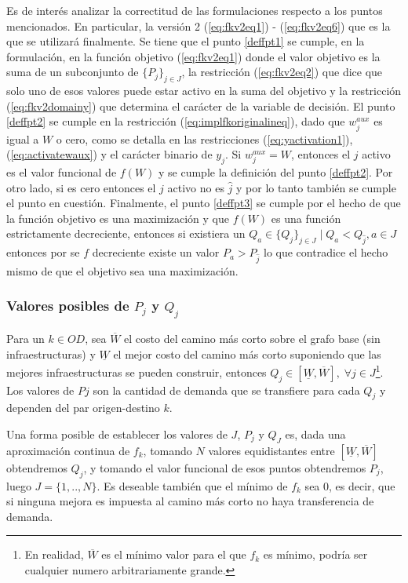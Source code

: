 \documentclass{article}
\begin{document}
  Es de interés analizar la correctitud de las formulaciones respecto a los puntos mencionados. En particular, la versión 2 (\ref{eq:fkv2eq1}) - (\ref{eq:fkv2eq6}) que es la que se utilizará finalmente. Se tiene que el punto \ref{deffpt1} se cumple, en la formulación, en la función objetivo (\ref{eq:fkv2eq1}) donde el valor objetivo es la suma de un subconjunto de $\{P_j\}_{j \in J}$, la restricción (\ref{eq:fkv2eq2}) que dice que solo uno de esos valores puede estar activo en la suma del objetivo y la restricción (\ref{eq:fkv2domainy}) que determina el carácter de la variable de decisión. El punto \ref{deffpt2} se cumple en la restricción (\ref{eq:implfkoriginalineq}), dado que $w^{aux}_j$ es igual a $W$ o cero, como se detalla en las restricciones (\ref{eq:yactivation1}), (\ref{eq:activatewaux}) y el carácter binario de $y_j$. Si $w^{aux}_j = W$, entonces el $j$ activo es el valor funcional de $f(W)$ y se cumple la definición del punto \ref{deffpt2}. Por otro lado, si es cero entonces el $j$ activo no es $\hat{j}$ y por lo tanto también se cumple el punto en cuestión. Finalmente, el punto \ref{deffpt3} se cumple por el hecho de que la función objetivo es una maximización y que $f(W)$ es una función estrictamente decreciente, entonces si existiera un $Q_a \in \{Q_j\}_{j \in J} \;|\; Q_a < Q_{\hat{j}}, a \in J$ entonces por se $f$ decreciente existe un valor $P_a > P_{\hat{j}}$ lo que contradice el hecho mismo de que el objetivo sea una maximización.

  \subsubsection*{Valores posibles de $P_j$ y $Q_j$}

  Para un $k \in OD$, sea $\overline{W}$ el costo del camino más corto sobre el grafo base (sin infraestructuras) y $\underline{W}$ el mejor costo del camino más corto suponiendo que las mejores infraestructuras se pueden construir, entonces $Q_j \in [\underline{W}, \overline{W}],\; \forall j \in J$\footnote{En realidad, $\overline{W}$ es el mínimo valor para el que $f_k$ es mínimo, podría ser cualquier numero arbitrariamente grande.}. Los valores de $Pj$ son la cantidad de demanda que se transfiere para cada $Q_j$ y dependen del par origen-destino $k$.

  Una forma posible de establecer los valores de $J$, $P_j$ y $Q_J$ es, dada una aproximación continua de $f_k$, tomando $N$ valores equidistantes entre $[\underline{W}, \overline{W}]$ obtendremos $Q_j$, y tomando el valor funcional de esos puntos obtendremos $P_j$, luego $J=\{1,..,N\}$. Es deseable también que el mínimo de $f_k$ sea 0, es decir, que si ninguna mejora es impuesta al camino más corto no haya transferencia de demanda.
\end{document}
